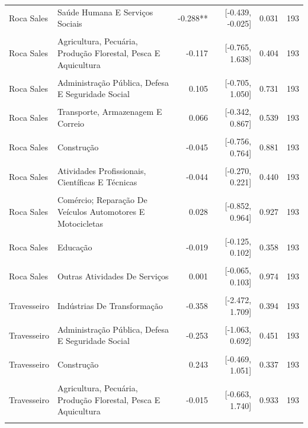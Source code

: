 \begin{tabular}{llrrrr}
Roca Sales & Saúde Humana E Serviços Sociais & -0.288** & [-0.439, -0.025] & 0.031 & 193 \\\\
Roca Sales & Agricultura, Pecuária, Produção Florestal, Pesca E Aquicultura & -0.117 & [-0.765, 1.638] & 0.404 & 193 \\\\
Roca Sales & Administração Pública, Defesa E Seguridade Social & 0.105 & [-0.705, 1.050] & 0.731 & 193 \\\\
Roca Sales & Transporte, Armazenagem E Correio & 0.066 & [-0.342, 0.867] & 0.539 & 193 \\\\
Roca Sales & Construção & -0.045 & [-0.756, 0.764] & 0.881 & 193 \\\\
Roca Sales & Atividades Profissionais, Científicas E Técnicas & -0.044 & [-0.270, 0.221] & 0.440 & 193 \\\\
Roca Sales & Comércio; Reparação De Veículos Automotores E Motocicletas & 0.028 & [-0.852, 0.964] & 0.927 & 193 \\\\
Roca Sales & Educação & -0.019 & [-0.125, 0.102] & 0.358 & 193 \\\\
Roca Sales & Outras Atividades De Serviços & 0.001 & [-0.065, 0.103] & 0.974 & 193 \\\\
Travesseiro & Indústrias De Transformação & -0.358 & [-2.472, 1.709] & 0.394 & 193 \\\\
Travesseiro & Administração Pública, Defesa E Seguridade Social & -0.253 & [-1.063, 0.692] & 0.451 & 193 \\\\
Travesseiro & Construção & 0.243 & [-0.469, 1.051] & 0.337 & 193 \\\\
Travesseiro & Agricultura, Pecuária, Produção Florestal, Pesca E Aquicultura & -0.015 & [-0.663, 1.740] & 0.933 & 193 \\\\
\hline
\end{tabular}
